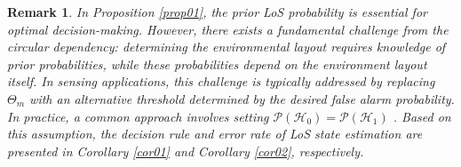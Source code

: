 \documentclass[conference, a4paper]{IEEEtran}
\newtheorem{rmk}{Remark}
\newcommand{\corref}[1]{{\it Corollary \ref{#1}}}
\newcommand{\propref}[1]{{\it Proposition \ref{#1}}}
\begin{document}
\begin{rmk} \label{rmk02}
	In \propref{prop01}, the prior LoS probability is essential for optimal decision-making.
	However, there exists a fundamental challenge from the circular dependency: determining the environmental layout requires knowledge of prior probabilities, while these probabilities depend on the environment layout itself.
	In sensing applications, this challenge is typically addressed by replacing $\Theta_{m}$ with an alternative threshold determined by the desired false alarm probability.
	In practice, a common approach involves setting $\mathcal{P}(\mathcal{H}_{0}) = \mathcal{P}(\mathcal{H}_{1})$ \cite{Cook2012}.
	Based on this assumption, the decision rule and error rate of LoS state estimation are presented in \corref{cor01} and \corref{cor02}, respectively.
\end{rmk}
\end{document}
